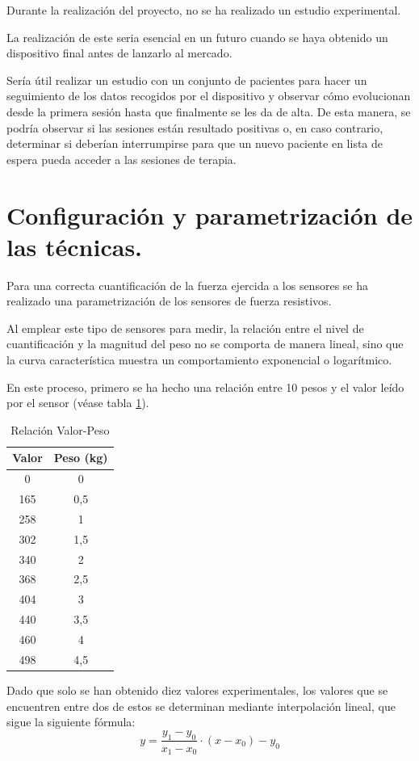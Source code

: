 Durante la realización del proyecto, no se ha realizado un estudio experimental. 

La realización de este seria esencial en un futuro cuando se haya obtenido un dispositivo final antes de lanzarlo al mercado. 

Sería útil realizar un estudio con un conjunto de pacientes para hacer un seguimiento de los datos recogidos por el dispositivo y observar cómo evolucionan desde la primera sesión hasta que finalmente se les da de alta.
De esta manera, se podría observar si las sesiones están resultado positivas o, en caso contrario, determinar si deberían interrumpirse para que un nuevo paciente en lista de espera pueda acceder a las sesiones de terapia.

\section{Configuración y parametrización de las técnicas.}

Para una correcta cuantificación de la fuerza ejercida a los sensores se ha realizado una parametrización de los sensores de fuerza resistivos. 

Al emplear este tipo de sensores para medir, la relación entre el nivel de cuantificación y la magnitud del peso no se comporta de manera lineal, sino que la curva característica muestra un comportamiento exponencial o logarítmico. 

En este proceso, primero se ha hecho una relación entre 10 pesos y el valor leído por el sensor (véase tabla \ref{tab:Relación Valor-Peso}). 
\begin{table}[h]
    \centering
    \begin{tabular}{|c|c|}
    \rowcolor[HTML]{BFBFBF} 
        \hline
        \textbf{Valor} & \textbf{Peso (kg)} \\ \hline
        0   & 0    \\ \hline
        165 & 0,5  \\ \hline
        258 & 1    \\ \hline
        302 & 1,5  \\ \hline
        340 & 2    \\ \hline
        368 & 2,5  \\ \hline
        404 & 3    \\ \hline
        440 & 3,5  \\ \hline
        460 & 4    \\ \hline
        498 & 4,5  \\ \hline
   \end{tabular}
    \caption{Relación Valor-Peso}
    \label{tab:Relación Valor-Peso}
\end{table}
Dado que solo se han obtenido diez valores experimentales, los valores que se encuentren entre dos de estos se determinan mediante interpolación lineal, que sigue la siguiente fórmula:
\begin{equation}
    y = \frac{y_1 - y_0}{x_1 - x_0} \cdot (x - x_0) - y_0
    \label{eq: Interpolación lineal}
\end{equation}

